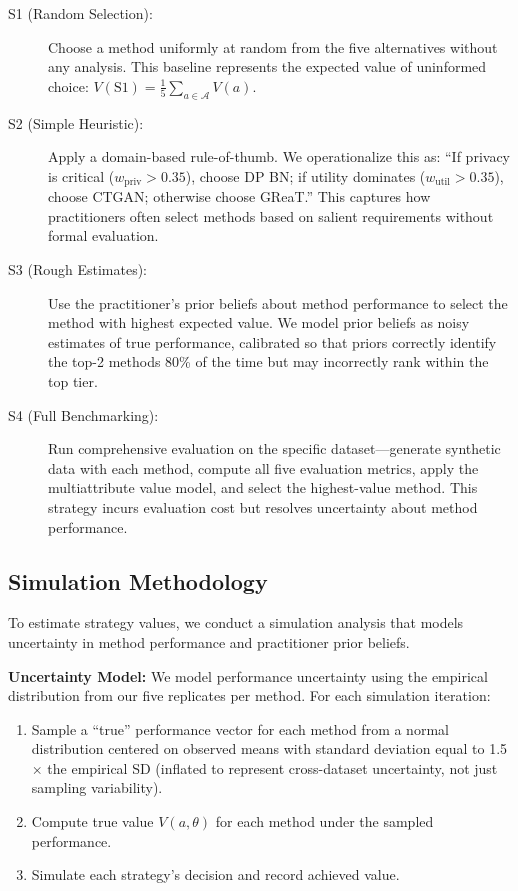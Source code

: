 \documentclass[12pt,a4paper]{article}
\begin{document}
\begin{description}
    \item[S1 (Random Selection):] Choose a method uniformly at random from the five alternatives without any analysis. This baseline represents the expected value of uninformed choice: $V(\text{S1}) = \frac{1}{5}\sum_{a \in \mathcal{A}} V(a)$.
    
    \item[S2 (Simple Heuristic):] Apply a domain-based rule-of-thumb. We operationalize this as: ``If privacy is critical ($w_{\text{priv}} > 0.35$), choose DP BN; if utility dominates ($w_{\text{util}} > 0.35$), choose CTGAN; otherwise choose GReaT.'' This captures how practitioners often select methods based on salient requirements without formal evaluation.
    
    \item[S3 (Rough Estimates):] Use the practitioner's prior beliefs about method performance to select the method with highest expected value. We model prior beliefs as noisy estimates of true performance, calibrated so that priors correctly identify the top-2 methods 80\% of the time but may incorrectly rank within the top tier.
    
    \item[S4 (Full Benchmarking):] Run comprehensive evaluation on the specific dataset---generate synthetic data with each method, compute all five evaluation metrics, apply the multiattribute value model, and select the highest-value method. This strategy incurs evaluation cost but resolves uncertainty about method performance.
\end{description}

\subsection{Simulation Methodology}

To estimate strategy values, we conduct a simulation analysis that models uncertainty in method performance and practitioner prior beliefs.

\textbf{Uncertainty Model:} We model performance uncertainty using the empirical distribution from our five replicates per method. For each simulation iteration:
\begin{enumerate}
    \item Sample a ``true'' performance vector for each method from a normal distribution centered on observed means with standard deviation equal to 1.5$\times$ the empirical SD (inflated to represent cross-dataset uncertainty, not just sampling variability).
    \item Compute true value $V(a, \theta)$ for each method under the sampled performance.
    \item Simulate each strategy's decision and record achieved value.
\end{enumerate}
\end{document}

